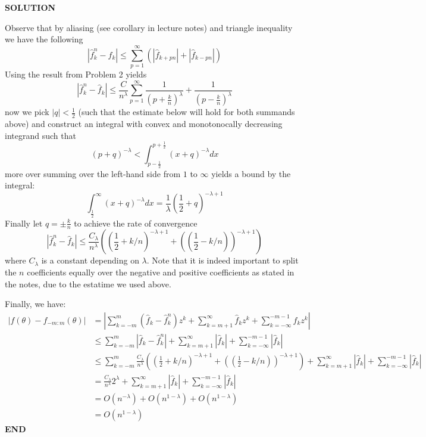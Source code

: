 \documentclass[12pt,a4paper]{article}
\begin{document}
\textbf{SOLUTION}

Observe that by aliasing (see corollary in lecture notes) and triangle inequality we have the following
\[
|\hat f_k^n - \hat f_k|  \ensuremath{\leq} \ensuremath{\sum}_{p=1}^{\ensuremath{\infty}} (|\hat f_{k+pn}|+|\hat f_{k-pn}|)
\]
Using the result from Problem 2 yields
\[
|\hat f_k^n - \hat f_k| \ensuremath{\leq} \frac{C}{n^\ensuremath{\lambda}} \ensuremath{\sum}_{p=1}^{\ensuremath{\infty}} \frac{1}{\left(p + \frac{k}{n}\right)^\ensuremath{\lambda}} + \frac{1}{\left(p - \frac{k}{n}\right)^\ensuremath{\lambda}}
\]
now we pick $|q| < \frac{1}{2}$ (such that the estimate below will hold for both summands above) and construct an integral with convex and monotonocally decreasing integrand such that
\[
\left( p + q \right)^{-\ensuremath{\lambda}} < \int_{p-\frac{1}{2}}^{p+\frac{1}{2}} (x + q)^{-\ensuremath{\lambda}} dx
\]
more over summing over the left-hand side from $1$ to $\ensuremath{\infty}$ yields a bound by the integral:
\[
\int^{\ensuremath{\infty}}_{\frac{1}{2}} (x + q)^{-\ensuremath{\lambda}} dx = \frac{1}{\ensuremath{\lambda}}(\frac{1}{2} + q)^{- \ensuremath{\lambda} + 1}
\]
Finally let $q = \pm \frac{k}{n}$ to achieve the rate of convergence
\[
|\hat f_k^n - \hat f_k| \ensuremath{\leq} \frac{C_{\ensuremath{\lambda}}}{ n^{\ensuremath{\lambda}}} \left(  \left( \frac{1}{2} + k/n \right)^{ - \ensuremath{\lambda} + 1} + \left( \left( \frac{1}{2} - k/n \right) \right)^{- \ensuremath{\lambda} +1} \right)
\]
where $C_{\ensuremath{\lambda}}$ is a constant depending on $\ensuremath{\lambda}$. Note that it is indeed important to split the $n$ coefficients equally over the negative and positive coefficients as stated in the notes, due to the estatime we used above.

Finally, we have:
\begin{align*}
|f(\ensuremath{\theta}) - f_{-m:m}(\ensuremath{\theta})|
&= |\ensuremath{\sum}_{k=-m}^m {(\hat f_k - \hat f_k^n)z^k} + \ensuremath{\sum}_{k=m+1}^\ensuremath{\infty} {\hat f_k z^k}  + \ensuremath{\sum}_{k=-\ensuremath{\infty}}^{-m-1} {\hat f_k z^k} | \\
&\le \ensuremath{\sum}_{k=-m}^m | \hat f_k - \hat f_k^n | + \ensuremath{\sum}_{k=m+1}^\ensuremath{\infty} |\hat f_k| +  \ensuremath{\sum}_{k=-\ensuremath{\infty}}^{-m-1} |\hat f_k| \\
&\le \ensuremath{\sum}_{k=-m}^m {\frac{C_{\ensuremath{\lambda}}}{ n^{\ensuremath{\lambda}}} \left( \left( \frac{1}{2} + k/n \right)^{ - \ensuremath{\lambda} + 1} + \left( \left( \frac{1}{2} - k/n \right) \right)^{- \ensuremath{\lambda} +1} \right)} + \ensuremath{\sum}_{k=m+1}^\ensuremath{\infty} |\hat f_k| +  \ensuremath{\sum}_{k=-\ensuremath{\infty}}^{-m-1} |\hat f_k| \\
&= \frac{C_{\ensuremath{\lambda}}}{n^{\ensuremath{\lambda}}} 2^{\ensuremath{\lambda}} + \ensuremath{\sum}_{k=m+1}^\ensuremath{\infty} |\hat f_k| +  \ensuremath{\sum}_{k=-\ensuremath{\infty}}^{-m-1} |\hat f_k|  \\
&= O(n^{-\ensuremath{\lambda}}) + O(n^{1-\ensuremath{\lambda}} ) + O(n^{1-\ensuremath{\lambda}} ) \\
&= O(n^{1-\ensuremath{\lambda}})
\end{align*}
\textbf{END}
\end{document}
